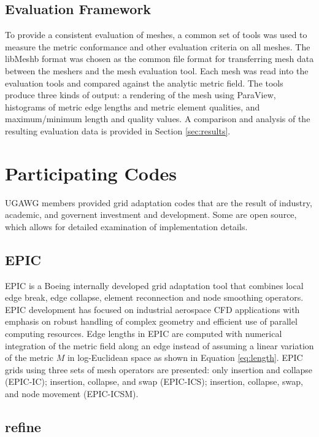 \documentclass[3p,times,procedia,number]{elsarticle}
\begin{document}
\subsection{Evaluation Framework}

To provide a consistent evaluation of meshes, a common set of tools was used to measure the metric conformance and other evaluation criteria on all meshes.
The libMeshb\cite{libMeshb-website} format was chosen as the common file format for transferring mesh data between the meshers and the mesh evaluation tool.
Each mesh was read into the evaluation tools and compared against the analytic metric field.
The tools produce three kinds of output: a rendering of the mesh using ParaView,\cite{paraview-book}
histograms of metric edge lengths and metric element qualities, and maximum/minimum length
and quality values.
A comparison and analysis of the resulting evaluation data is provided in Section \ref{sec:results}.

\section{Participating Codes}
\label{sec:codes}

UGAWG members provided grid adaptation codes that are the result of
industry, academic, and governent investment and development.
Some are open source, which allows for detailed examination of
implementation details.

\subsection{EPIC}

EPIC is a Boeing internally developed grid adaptation tool that combines
local edge break, edge collapse, element reconnection and node smoothing
operators.\cite{michal-krakos-aniso-adapt-edge,michal-unstruct-adapt-epic-dpw6}
EPIC development has focused on industrial aerospace CFD
applications with emphasis on robust handling of complex geometry and
efficient use of parallel computing resources. Edge lengths in EPIC are
computed with numerical integration of the metric field along an edge
instead of assuming a linear variation of the metric $M$ in log-Euclidean space
as shown in Equation \ref{eq:length}.
EPIC grids using three sets of mesh operators are presented:
only insertion and collapse (EPIC-IC); insertion, collapse, and swap (EPIC-ICS);
insertion, collapse, swap, and node movement (EPIC-ICSM).

\subsection{refine}
\end{document}
